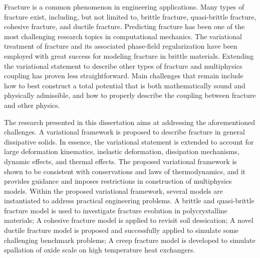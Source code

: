 \abstract

Fracture is a common phenomenon in engineering applications. Many types of fracture exist, including, but not limited to, brittle fracture, quasi-brittle fracture, cohesive fracture, and ductile fracture. Predicting fracture has been one of the most challenging research topics in computational mechanics. The variational treatment of fracture and its associated phase-field regularization have been employed with great success for modeling fracture in brittle materials. Extending the variational statement to describe other types of fracture and multiphysics coupling has proven less straightforward. Main challenges that remain include how to best construct a total potential that is both mathematically sound and physically admissible, and how to properly describe the coupling between fracture and other physics.

The research presented in this dissertation aims at addressing the aforementioned challenges. A variational framework is proposed to describe fracture in general dissipative solids. In essence, the variational statement is extended to account for large deformation kinematics, inelastic deformation, dissipation mechanisms, dynamic effects, and thermal effects. The proposed variational framework is shown to be consistent with conservations and laws of thermodynamics, and it provides guidance and imposes restrictions in construction of multiphysics models. Within the proposed variational framework, several models are instantiated to address practical engineering problems. A brittle and quasi-brittle fracture model is used to investigate fracture evolution in polycrystalline materials; A cohesive fracture model is applied to revisit soil dessication; A novel ductile fracture model is proposed and successfully applied to simulate some challenging benchmark problems; A creep fracture model is developed to simulate spallation of oxide scale on high temperature heat exchangers.
